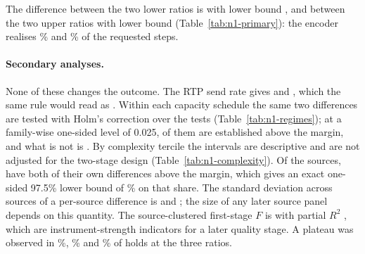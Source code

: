 \begin{table}[t]
\centering\small
\resizebox{\linewidth}{!}{}
\caption{Native actuator qualification. Mean over \NOneSources{} sources of the difference between adjacent assigned ratios in rate divided by the frozen bandwidth estimate, terciles weighted equally. Lower bounds are one-sided 97.5\% and upper bounds one-sided 98.75\%, both with the first-stage standard error on \NOneDegrees{} degrees of freedom; $p$ tests the difference against the margin of \NOneMargin{}. The last column is the mean as a share of the requested step of 0.20. The send-rate rows are secondary and do not enter the outcome.}
\label{tab:n1-primary}
\end{table}

The difference between the two lower ratios is \NOneLowerMean{} with lower bound \NOneLowerLow{}, and between the two upper ratios \NOneUpperMean{} with lower bound \NOneUpperLow{} (Table~\ref{tab:n1-primary}): the encoder realises \NOneLowerShare\% and \NOneUpperShare\% of the requested steps. \NOneOutcomeSentence{} \NOneConsequenceSentence{}

\paragraph{Secondary analyses.}
None of these changes the outcome. The RTP send rate gives \NOneSendLowerMean{} and \NOneSendUpperMean{}, which the same rule would read as \NOneSendVerdict{}. Within each capacity schedule the same two differences are tested with Holm's correction over the \NOneRegimeTests{} tests (Table~\ref{tab:n1-regimes}); at a family-wise one-sided level of 0.025, \NOneRegimeEstablished{} of them are established above the margin, and what is not is \NOneRegimeOpen{}. By complexity tercile the intervals are descriptive and are not adjusted for the two-stage design (Table~\ref{tab:n1-complexity}). \NOneDesignationSentence{} Of the \NOneSources{} sources, \NOneSeparating{} have both of their own differences above the margin, which gives an exact one-sided 97.5\% lower bound of \NOneSeparatingBound\% on that share. The standard deviation across sources of a per-source difference is \NOneLowerSd{} \NOneLowerSdInterval{} and \NOneUpperSd{} \NOneUpperSdInterval{}; the size of any later source panel depends on this quantity. The source-clustered first-stage $F$ is \NOneEncoderF{} with partial $R^2$ \NOneEncoderRsq{}, which are instrument-strength indicators for a later quality stage. A plateau was observed in \NOnePlateauLow\%, \NOnePlateauMid\% and \NOnePlateauHigh\% of holds at the three ratios.

